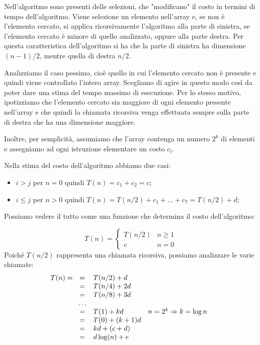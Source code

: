 Nell'algoritmo sono presenti delle selezioni, che "modificano" il costo in
termini di tempo dell'algoritmo. Viene selezione un elemento 
nell'array e, se non è l'elemento cercato, si applica ricorsivamente l'algoritmo
alla parte di sinistra, se l'elemento cercato è minore di quello analizzato,
oppure alla parte destra. Per questa caratteristica dell'algoritmo si ha che la
parte di sinistra ha dimensione $(n-1)/2$, mentre quella di destra $n/2$.

\bigskip\noindent
Analizziamo il caso pessimo, cioè quello in cui l'elemento cercato non è presente
e quindi viene controllato l'intero array. Scegliamo di agire in questo modo così
da poter dare una stima del tempo massimo di esecuzione. Per lo stesso motivo,
ipotizziamo che l'elemento cercato sia maggiore di ogni elemento presente
nell'array e che quindi la chiamata ricorsiva venga effettuata sempre sulla parte
di destra che ha una dimensione maggiore.

Inoltre, per semplicità, assumiamo che l'array contenga un numero $2^k$ di
elementi e assegniamo ad ogni istruzione elementare un costo $c_i$.

\bigskip\noindent
Nella stima del costo dell'algoritmo abbiamo due casi:
\begin{itemize}
    \item $i > j$ per $n = 0$ quindi $T(n) = c_1 + c_2 = c$;
    \item $i\leq j$ per $n > 0$ quindi $T(n) = T(n/2)+c_1+\dots+c_7=
    T(n/2) + d$;
\end{itemize}
Possiamo vedere il tutto come una funzione che determina il costo dell'algoritmo:

\[T(n)=\begin{cases}
    T(n/2) & n\geq 1\\
    c & n = 0
\end{cases}\]
Poiché $T(n/2)$ rappresenta una chiamata ricorsiva, possiamo analizzare le varie
chiamate:
\[T(n)=\begin{array}[t]{cll}
    = & T(n/2)+d\\
    = & T(n/4)+2d\\
    = & T(n/8)+3d\\
    \dots\\
    = & T(1)+kd & n=2^k\Rightarrow k=\log n\\
    = & T(0)+(k+1)d\\
    = & kd+(c+d)\\
    = & d\log(n)+e
\end{array}\]

